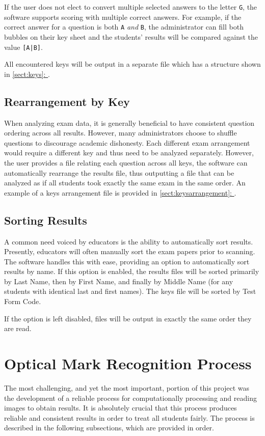 \documentclass[12pt, letterpaper]{report}
\newcommand*{\sectref}[1]{\hyperref[{#1}]{\ref*{#1}: \nameref*{#1}}}
\begin{document}
If the user does not elect to convert multiple selected answers to the letter
\verb!G!, the software supports scoring with multiple correct answers. For
example, if the correct answer for a question is both \verb!A! \textit{and} \verb!B!,
the administrator can fill both bubbles on their key sheet and the students'
results will be compared against the value \verb![A|B]!.

All encountered keys will be output in a separate file which has a structure shown in
\sectref{sect:keys}.

\subsection{Rearrangement by Key}
\label{sect:rearranging}
When analyzing exam data, it is generally beneficial to have consistent
question ordering across all results. However, many administrators choose to
shuffle questions to discourage academic dishonesty. Each different exam
arrangement would require a different key and thus need to be analyzed separately.
However, the user provides a file relating each question across all keys, the
software can automatically rearrange the results file, thus outputting a file
that can be analyzed as if all students took exactly the same exam in the same
order. An example of a keys arrangement file is provided in
\sectref{sect:keysarrangement}.

\subsection{Sorting Results}
A common need voiced by educators is the ability to automatically sort results.
Presently, educators will often manually sort the exam papers prior to scanning.
The software handles this with ease, providing an option to automatically sort
results by name. If this option is enabled, the results files will be sorted
primarily by Last Name, then by First Name, and finally by Middle Name (for any
students with identical last and first names). The keys file will be sorted by
Test Form Code.

If the option is left disabled, files will be output in exactly the same order
they are read.

\section{Optical Mark Recognition Process}
\label{sect:process}
The most challenging, and yet the most important, portion of this project was
the development of a reliable process for computationally processing and reading
images to obtain results. It is absolutely crucial that this process produces
reliable and consistent results in order to treat all students fairly. The
process is described in the following subsections, which are provided in order.
\end{document}
